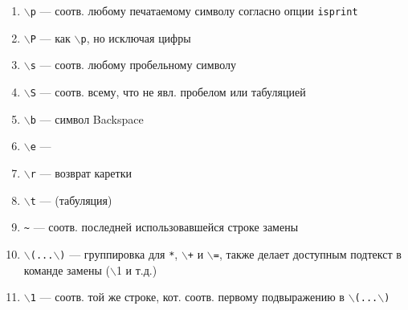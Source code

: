 \documentclass[a4paper,10pt, twocolumn]{article}
\newcommand*{\cod}[1]{\texttt{#1}}
\begin{document}
\begin{enumerate}
    \item \cod{$\backslash$p} --- соотв. любому печатаемому символу согласно опции \cod{isprint}
    \item \cod{$\backslash$P} --- как \cod{$\backslash$p}, но исключая цифры
    \item \cod{$\backslash$s} --- соотв. любому пробельному символу
    \item \cod{$\backslash$S} --- соотв. всему, что не явл. пробелом или табуляцией 
    \item \cod{$\backslash$b} --- символ Backspace
    \item \cod{$\backslash$e} --- \Esc
    \item \cod{$\backslash$r} --- возврат каретки
    \item \cod{$\backslash$t} --- \Tab (табуляция)
    \item \cod{\~} --- соотв. последней использовавшейся строке замены
    \item \cod{$\backslash$(...$\backslash$)} --- группировка для \cod{*}, \cod{$\backslash$+} и \cod{$\backslash$=}, также делает доступным подтекст в команде замены ($\backslash$1 и т.д.)
    \item \cod{$\backslash$1} --- соотв. той же строке, кот. соотв. первому подвыражению в \cod{$\backslash$(...$\backslash$)}
\end{enumerate}
\end{document}
